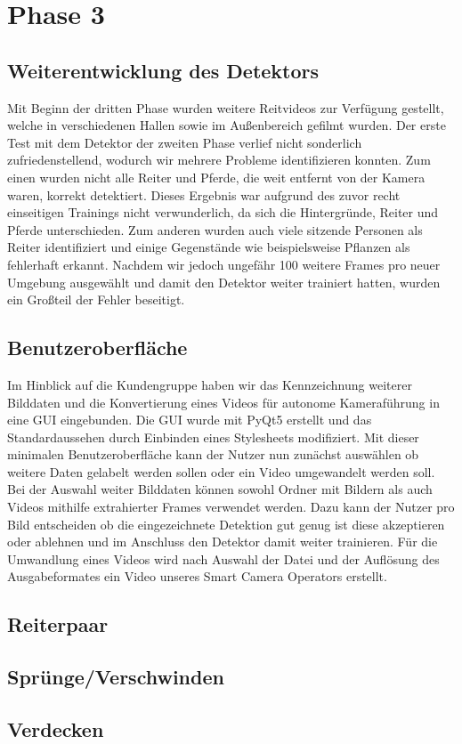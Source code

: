 



\section{Phase 3}
\subsection{Weiterentwicklung des Detektors}
Mit Beginn der dritten Phase wurden weitere Reitvideos zur Verfügung gestellt, welche in verschiedenen Hallen sowie im Außenbereich gefilmt wurden. Der erste Test mit dem Detektor der zweiten Phase verlief nicht sonderlich zufriedenstellend, wodurch wir mehrere Probleme identifizieren konnten. Zum einen wurden nicht alle Reiter und Pferde, die weit entfernt von der Kamera waren, korrekt detektiert. Dieses Ergebnis war aufgrund des zuvor recht einseitigen Trainings nicht verwunderlich, da sich die Hintergründe, Reiter und Pferde unterschieden. Zum anderen wurden auch viele sitzende Personen als Reiter identifiziert und einige Gegenstände wie beispielsweise Pflanzen als fehlerhaft erkannt. Nachdem wir jedoch ungefähr 100 weitere Frames pro neuer Umgebung ausgewählt und damit den Detektor weiter trainiert hatten, wurden ein Großteil der Fehler beseitigt.

\subsection{Benutzeroberfläche}
Im Hinblick auf die Kundengruppe haben wir das Kennzeichnung weiterer Bilddaten und die Konvertierung eines Videos für autonome Kameraführung in eine GUI eingebunden. Die GUI wurde mit PyQt5 erstellt und das Standardaussehen durch Einbinden eines Stylesheets modifiziert. Mit dieser minimalen Benutzeroberfläche kann der Nutzer nun zunächst auswählen ob weitere Daten gelabelt werden sollen oder ein Video umgewandelt werden soll. Bei der Auswahl weiter Bilddaten können sowohl Ordner mit Bildern als auch Videos mithilfe extrahierter Frames verwendet werden. Dazu kann der Nutzer pro Bild entscheiden ob die eingezeichnete Detektion gut genug ist diese akzeptieren oder ablehnen und im Anschluss den Detektor damit weiter trainieren. Für die Umwandlung eines Videos wird nach Auswahl der Datei und der Auflösung des Ausgabeformates ein Video unseres Smart Camera Operators erstellt.


\subsection{Reiterpaar}
\subsection{Sprünge/Verschwinden}
\subsection{Verdecken}
